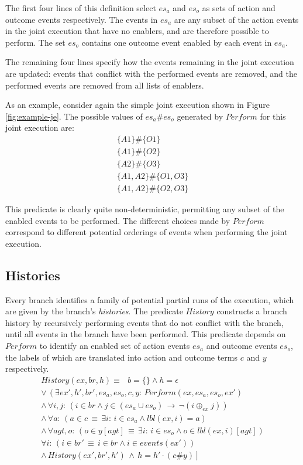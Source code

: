 The first four lines of this definition select $es_{a}$ and $es_{o}$
as sets of action and outcome events respectively. The events in $es_{a}$
are any subset of the action events in the joint execution that have
no enablers, and are therefore possible to perform. The set $es_{o}$
contains one outcome event enabled by each event in $es_{a}$.

The remaining four lines specify how the events remaining in the joint
execution are updated: events that conflict with the performed events
are removed, and the performed events are removed from all lists of
enablers.

As an example, consider again the simple joint execution shown in
Figure \ref{fig:example-je}. The possible values of $es_{a}\#es_{o}$
generated by $Perform$ for this joint execution are:\begin{gather*}
\{A1\}\#\{O1\}\\
\{A1\}\#\{O2\}\\
\{A2\}\#\{O3\}\\
\{A1,A2\}\#\{O1,O3\}\\
\{A1,A2\}\#\{O2,O3\}\end{gather*}


This predicate is clearly quite non-deterministic, permitting any
subset of the enabled events to be performed. The different choices
made by $Perform$ correspond to different potential orderings of
events when performing the joint execution.


\subsection{Histories}

Every branch identifies a family of potential partial runs of the
execution, which are given by the branch's \emph{histories}. The predicate
$History$ constructs a branch history by recursively performing events
that do not conflict with the branch, until all events in the branch
have been performed. This predicate depends on $Perform$ to identify
an enabled set of action events $es_{a}$ and outcome events $es_{o}$,
the labels of which are translated into action and outcome terms $c$
and $y$ respectively. \begin{gather*}
History(ex,br,h)\equiv\,\,\,\, b=\{\}\wedge h=\epsilon\\
\vee\,\left(\exists ex',h',br',es_{a},es_{o},c,y:\, Perform(ex,es_{a},es_{o},ex')\right.\\
\wedge\,\forall i,j:\,\left(i\in br\wedge j\in(es_{a}\cup es_{o})\,\rightarrow\,\neg(i\oplus_{ex}j)\right)\\
\wedge\,\forall a:\,\left(a\in c\,\equiv\,\exists i:\, i\in es_{a}\wedge lbl(ex,i)=a\right)\\
\wedge\,\forall agt,o:\,\left(o\in y[agt]\,\equiv\,\exists i:\, i\in es_{o}\wedge o\in lbl(ex,i)[agt]\right)\\
\forall i:\,\left(i\in br'\,\equiv\, i\in br\wedge i\in events(ex')\right)\\
\left.\wedge\, History(ex',br',h')\,\wedge\, h=h'\cdot(c\#y)\right]\end{gather*}



